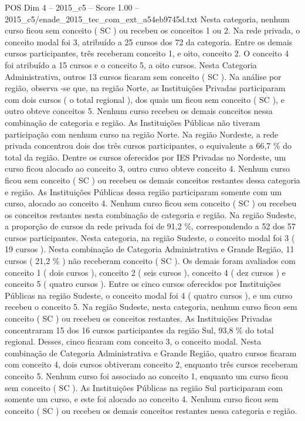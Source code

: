 \begin{textsample}{POS Dim 4 – 2015\_c5 – Score 1.00 – 2015\_c5/enade\_2015\_tec\_com\_ext\_a54eb9745d.txt}
Nesta categoria, nenhum curso ficou sem conceito ( SC ) ou recebeu os conceitos 1 ou 2.
Na rede privada, o conceito modal foi 3, atribuído a 25 cursos dos 72 da categoria.
Entre os demais cursos participantes, três receberam conceito 1, e oito, conceito 2.
O conceito 4 foi atribuído a 15 cursos e o conceito 5, a oito cursos.
Nesta Categoria Administrativa, outros 13 cursos ficaram sem conceito ( SC ).
Na análise por região, observa -se que, na região Norte, as Instituições Privadas participaram com dois cursos ( o total regional ), dos quais um ficou sem conceito ( SC ), e outro obteve conceitos 5.
Nenhum curso recebeu os demais conceitos nessa combinação de categoria e região.
As Instituições Públicas não tiveram participação com nenhum curso na região Norte.
Na região Nordeste, a rede privada concentrou dois dos três cursos participantes, o equivalente a 66,7 \% do total da região.
Dentre os cursos oferecidos por IES Privadas no Nordeste, um curso ficou alocado ao conceito 3, outro curso obteve conceito 4.
Nenhum curso ficou sem conceito ( SC ) ou recebeu os demais conceitos restantes dessa categoria e região.
As Instituições Públicas dessa região participaram somente com um curso, alocado ao conceito 4.
Nenhum curso ficou sem conceito ( SC ) ou recebeu os conceitos restantes nesta combinação de categoria e região.
Na região Sudeste, a proporção de cursos da rede privada foi de 91,2 \%, correspondendo a 52 dos 57 cursos participantes.
Nesta categoria, na região Sudeste, o conceito modal foi 3 ( 19 cursos ).
Nesta combinação de Categoria Administrativa e Grande Região, 11 cursos ( 21,2 \% ) não receberam conceito ( SC ).
Os demais foram avaliados com conceito 1 ( dois cursos ), conceito 2 ( seis cursos ), conceito 4 ( dez cursos ) e conceito 5 ( quatro cursos ).
Entre os cinco cursos oferecidos por Instituições Públicas na região Sudeste, o conceito modal foi 4 ( quatro cursos ), e um curso recebeu o conceito 5.
Na região Sudeste, nesta categoria, nenhum curso ficou sem conceito ( SC ) ou recebeu os conceitos restantes.
As Instituições Privadas concentraram 15 dos 16 cursos participantes da região Sul, 93,8 \% do total regional.
Desses, cinco ficaram com conceito 3, o conceito modal.
Nesta combinação de Categoria Administrativa e Grande Região, quatro cursos ficaram com conceito 4, dois cursos obtiveram conceito 2, enquanto três cursos receberam conceito 5.
Nenhum curso foi associado ao conceito 1, enquanto um curso ficou sem conceito ( SC ).
As Instituições Públicas na região Sul participaram com somente um curso, e este foi alocado ao conceito 4.
Nenhum curso ficou sem conceito ( SC ) ou recebeu os demais conceitos restantes nessa categoria e região.

\end{textsample}
